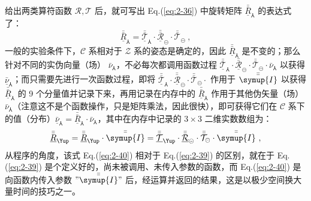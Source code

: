 给出两类算符函数 $\mathcal{R}, \mathcal{T}$ 后，就可写出 Eq.(\ref{eq:2-36}) 中旋转矩阵 $\bar{\bar{\underline{R}}}_{\Yup}$ 的表达式了：
\begin{equation} \label{eq:2-39}
	\bar{\bar{\underline{R}}}_{\Yup} = \bar{\bar{\underline{\mathcal{T}}}}_{\Yup} \cdot \bar{\bar{\underline{\mathcal{R}}}}_{\circleddash} \cdot \bar{\bar{\mathcal{T}}}_{\circleddash} ~,
\end{equation}
一般的实验条件下，$\mathcal{C}$ 系相对于 $\mathcal{Z}$ 系的姿态是确定的，因此 $\bar{\bar{\underline{R}}}_{\Yup}$ 是不变的；那么针对不同的实伪向量（场） ${\bar{\nu}}_{\Yup}$，不必每次都调用函数过程 $\bar{\bar{\underline{\mathcal{T}}}}_{\Yup} \cdot \bar{\bar{\underline{\mathcal{R}}}}_{\circleddash} \cdot \bar{\bar{\mathcal{T}}}_{\circleddash} \cdot {\bar{\nu}}_{\Yup}$ 以获得 ${\bar{\underline{\nu}}}_{\Yup}$；而只需要先进行一次函数过程，即将 $\bar{\bar{\underline{\mathcal{T}}}}_{\Yup} \cdot \bar{\bar{\underline{\mathcal{R}}}}_{\circleddash} \cdot \bar{\bar{\mathcal{T}}}_{\circleddash} \cdot$ 作用于 $\bar{\bar{\symup{I}}}$ 以获得 $\bar{\bar{\underline{R}}}_{\Yup}$ 的 9 个分量值并记录下来，再用记录在内存中的 $\bar{\bar{\underline{R}}}_{\Yup}$ 作用于其他伪矢量（场） ${\bar{\nu}}_{\Yup}$（注意这不是个函数操作，只是矩阵乘法，因此很快），即可获得它们在 $\mathcal{C}$ 系下的值（分布）${\bar{\underline{\nu}}}_{\Yup} = \bar{\bar{\underline{R}}}_{\Yup} \cdot {\bar{\nu}}_{\Yup}$，其中在内存中记录的 $3 \times 3$ 二维实数数组为：%
\begin{equation} \label{eq:2-40}
	\bar{\bar{\underline{R}}}_{\Yup} = \bar{\bar{\underline{R}}}_{\Yup} \cdot \bar{\bar{\symup{I}}} = \bar{\bar{\underline{\mathcal{T}}}}_{\Yup} \cdot \bar{\bar{\underline{\mathcal{R}}}}_{\circleddash} \cdot \bar{\bar{\mathcal{T}}}_{\circleddash} \cdot \bar{\bar{\symup{I}}} ~,
\end{equation}
从程序的角度，该式 Eq.(\ref{eq:2-40}) 相对于 Eq.(\ref{eq:2-39}) 的区别，就在于 Eq.(\ref{eq:2-39}) 是个定义好的，尚未被调用、未传入参数的函数，而 Eq.(\ref{eq:2-40}) 是向函数内传入参数 $"\bar{\bar{\symup{I}}}"$ 后，经运算并返回的结果，这是以极少空间换大量时间的技巧之一。

